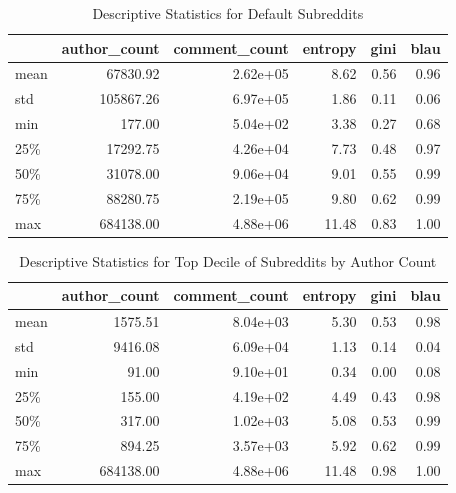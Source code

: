 \documentclass{article}
\begin{document}
\begin{table}
\centering
\begin{tabular}{lrrrrr}
\toprule
{} &  author\_count &  comment\_count &  entropy &  gini &  blau \\
\midrule
mean &      67830.92 &       2.62e+05 &     8.62 &  0.56 &  0.96 \\
std  &     105867.26 &       6.97e+05 &     1.86 &  0.11 &  0.06 \\
min  &        177.00 &       5.04e+02 &     3.38 &  0.27 &  0.68 \\
25\%  &      17292.75 &       4.26e+04 &     7.73 &  0.48 &  0.97 \\
50\%  &      31078.00 &       9.06e+04 &     9.01 &  0.55 &  0.99 \\
75\%  &      88280.75 &       2.19e+05 &     9.80 &  0.62 &  0.99 \\
max  &     684138.00 &       4.88e+06 &    11.48 &  0.83 &  1.00 \\
\bottomrule
\end{tabular}

\caption{Descriptive Statistics for Default Subreddits}
\label{table:defaults} 
\end{table}


\begin{table}
\centering
\begin{tabular}{lrrrrr}
\toprule
{} &  author\_count &  comment\_count &  entropy &  gini &  blau \\
\midrule
mean &       1575.51 &       8.04e+03 &     5.30 &  0.53 &  0.98 \\
std  &       9416.08 &       6.09e+04 &     1.13 &  0.14 &  0.04 \\
min  &         91.00 &       9.10e+01 &     0.34 &  0.00 &  0.08 \\
25\%  &        155.00 &       4.19e+02 &     4.49 &  0.43 &  0.98 \\
50\%  &        317.00 &       1.02e+03 &     5.08 &  0.53 &  0.99 \\
75\%  &        894.25 &       3.57e+03 &     5.92 &  0.62 &  0.99 \\
max  &     684138.00 &       4.88e+06 &    11.48 &  0.98 &  1.00 \\
\bottomrule
\end{tabular}

\caption{Descriptive Statistics for Top Decile of Subreddits by Author Count}
\label{table:active} 
\end{table}
\end{document}
